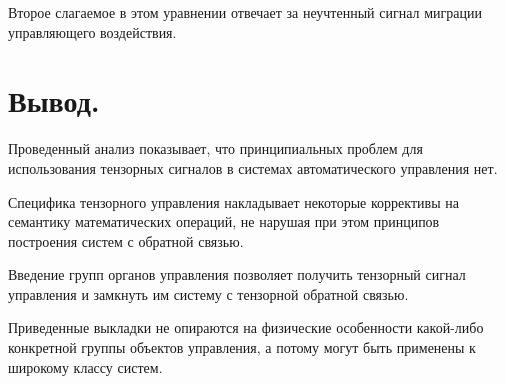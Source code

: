 \documentclass[a4paper]{article}
\begin{document}
Второе слагаемое в этом уравнении отвечает за неучтенный сигнал миграции управляющего воздействия.  

\section{Вывод.}
Проведенный анализ показывает, что принципиальных проблем для использования тензорных сигналов в системах автоматического управления нет. 

Специфика тензорного управления накладывает некоторые коррективы на семантику математических операций, не нарушая при этом принципов построения систем с обратной связью.

Введение групп органов управления позволяет получить тензорный сигнал управления и замкнуть им систему с тензорной обратной связью. 

Приведенные выкладки не опираются на физические особенности какой-либо конкретной группы объектов управления, а потому могут быть применены к широкому классу систем.
\end{document}
